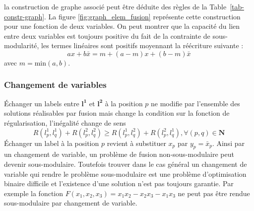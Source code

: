 \documentclass[../main/These_Mathias_Paget.tex]{subfiles}
\begin{document}
	la construction de graphe associé peut être déduite des règles de la Table~\ref{tab-constr-graph}. La figure \ref{fig:graph_elem_fusion} représente cette construction pour une fonction de deux variables. On peut montrer que la capacité du lien entre deux variables est toujours positive du fait de la contrainte de sous-modularité, les termes linéaires sont positifs moyennant la réécriture suivante :
	\begin{equation}
	ax+b\bar{x} = m + (a-m)x + (b-m)\bar{x}
	\end{equation}
avec $m=\text{min}(a,b)$.
	
	\subsubsection{Changement de variables}
	Échanger un labels entre $\boldsymbol{l^1}$ et $\boldsymbol{l^2}$ à la position $p$ ne modifie par l'ensemble des solutions réalisables par fusion mais change la condition sur la fonction de régularisation, l'inégalité change de sens
	\begin{equation}
	R(l^{1}_p,l^{1}_q) + R(l^{2}_p,l^{2}_q) \geq R(l^{1}_p,l^{2}_q) + R(l^{2}_p,l^{1}_q), \forall (p,q) \in \boldsymbol{N}
	\end{equation}
	Échanger un label à la position $p$ revient à substituer $x_p$ par $y_p = \bar{x}_p$. Ainsi par un changement de variable, un problème de fusion non-sous-modulaire peut devenir sous-modulaire. Toutefois trouver dans le cas général un changement de variable qui rendre le problème sous-modulaire est une problème d'optimisation binaire difficile et l’existence d'une solution n'est pas toujours garantie. Par exemple la fonction $F(x_1,x_2,x_3)= x_1x_2  - x_2x_3 - x_1x_3$ ne peut pas être rendue sous-modulaire par changement de variable. 
	
\end{document}
